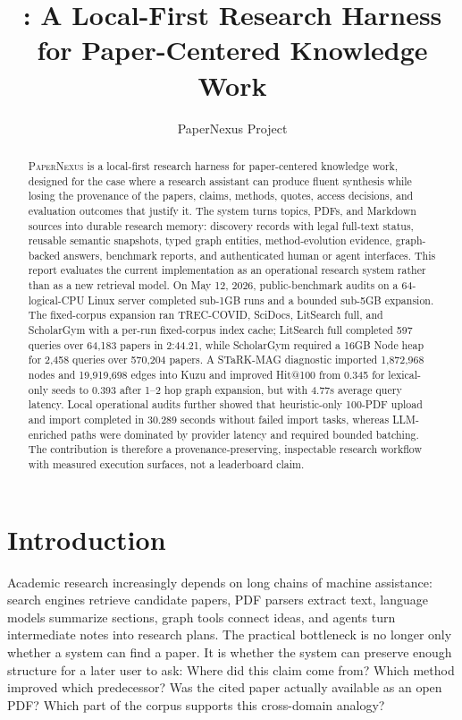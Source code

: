 \documentclass[11pt]{article}
\title{\papernexus: A Local-First Research Harness for Paper-Centered Knowledge Work}
\author{
  PaperNexus Project
}
\date{}
\newcommand{\papernexus}{\textsc{PaperNexus}}
\begin{document}
\maketitle

\begin{abstract}
\papernexus{} is a local-first research harness for paper-centered knowledge work, designed for the case where a research assistant can produce fluent synthesis while losing the provenance of the papers, claims, methods, quotes, access decisions, and evaluation outcomes that justify it. The system turns topics, PDFs, and Markdown sources into durable research memory: discovery records with legal full-text status, reusable semantic snapshots, typed graph entities, method-evolution evidence, graph-backed answers, benchmark reports, and authenticated human or agent interfaces. This report evaluates the current implementation as an operational research system rather than as a new retrieval model. On May 12, 2026, public-benchmark audits on a 64-logical-CPU Linux server completed sub-1GB runs and a bounded sub-5GB expansion. The fixed-corpus expansion ran TREC-COVID, SciDocs, LitSearch full, and ScholarGym with a per-run fixed-corpus index cache; LitSearch full completed 597 queries over 64,183 papers in 2:44.21, while ScholarGym required a 16GB Node heap for 2,458 queries over 570,204 papers. A STaRK-MAG diagnostic imported 1,872,968 nodes and 19,919,698 edges into Kuzu and improved Hit@100 from 0.345 for lexical-only seeds to 0.393 after 1--2 hop graph expansion, but with 4.77s average query latency. Local operational audits further showed that heuristic-only 100-PDF upload and import completed in 30.289 seconds without failed import tasks, whereas LLM-enriched paths were dominated by provider latency and required bounded batching. The contribution is therefore a provenance-preserving, inspectable research workflow with measured execution surfaces, not a leaderboard claim.
\end{abstract}

\section{Introduction}

Academic research increasingly depends on long chains of machine assistance: search engines retrieve candidate papers, PDF parsers extract text, language models summarize sections, graph tools connect ideas, and agents turn intermediate notes into research plans. The practical bottleneck is no longer only whether a system can find a paper. It is whether the system can preserve enough structure for a later user to ask: Where did this claim come from? Which method improved which predecessor? Was the cited paper actually available as an open PDF? Which part of the corpus supports this cross-domain analogy?
\end{document}
